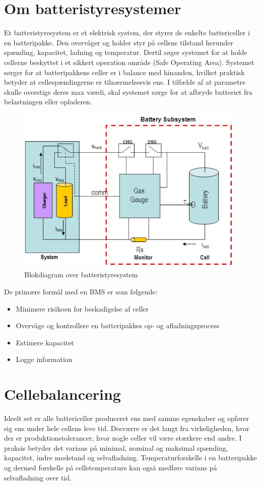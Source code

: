\section{Om batteristyresystemer}
Et batteristyresystem er et elektrisk system, der styrer de enkelte battericeller i en batteripakke. Den overvåger og holder styr på cellens tilstand herunder spænding, kapacitet, ladning og temperatur. Dertil søger systemet for at holde cellerne beskyttet i et sikkert operation område (Safe Operating Area). Systemet sørger for at batteripakkens celler er i balance med hinanden, hvilket praktisk betyder at cellespændingerne er tilnærmelsesvis ens. I tilfælde af at parametre skulle overstige deres max værdi, skal systemet sørge for at afbryde batteriet fra belastningen eller opladeren.
\\
\begin{figure}[h]
	\centering
	\includegraphics[width=11cm]{billeder/battery_management_block.png}
	\caption{Blokdiagram over batteristyresystem}
	\label{fig:battery_management_block}
\end{figure}

De primære formål med en BMS er som følgende:
\begin{itemize}[noitemsep]
	\item Minimere risikoen for beskadigelse af celler
	\item Overvåge og kontrollere en batteripakkes op- og afladningsprocess
	\item Estimere kapacitet
	\item Logge information
\end{itemize}


\section{Cellebalancering}
Ideelt set er alle battericeller produceret ens med samme egenskaber og opfører sig ens under hele cellens leve tid. Desværre er det langt fra virkeligheden, hvor der er produktionstolerancer, hvor nogle celler vil være stærkere end andre. I praksis betyder det varians på minimal, nominal og maksimal spænding, kapacitet, indre modstand og selvafladning.
Temperaturforskelle i en batteripakke og dermed forskelle på celletemperature kan også medføre varians på selvafladning over tid.
\\

